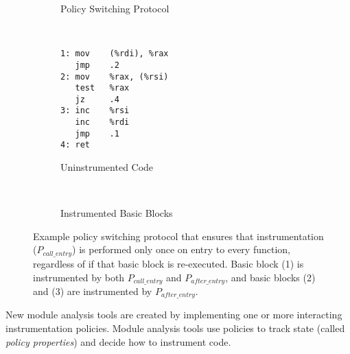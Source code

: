 \documentclass[letterpaper,twocolumn,10pt]{article}
\let\ORIGcaption\caption
\renewcommand{\caption}[2][\compressedcaption]{%
\def\compressedcaption{#2}%
    \vspace{-5pt}%
    \ORIGcaption[#1]{#2}%
    \vspace{-12pt}}
\begin{document}
\lstset{language=[x64]Assembler}
\begin{figure*}[ht!]
\centering
\begin{subfigure}[b]{0.33\textwidth}
\ORIGcaption{Policy Switching Protocol}
\end{subfigure}%
~
\begin{subfigure}[b]{0.33\textwidth}%
\begin{lstlisting}[basicstyle=\footnotesize\ttfamily]
1: mov    (%rdi), %rax
   jmp    .2
2: mov    %rax, (%rsi)
   test   %rax
   jz     .4
3: inc    %rsi
   inc    %rdi
   jmp    .1
4: ret
\end{lstlisting}
\ORIGcaption{Uninstrumented Code}
\end{subfigure}%
~
\begin{subfigure}[b]{0.33\textwidth}%
\hspace{-3em}
\ORIGcaption{Instrumented Basic Blocks}
\end{subfigure}
\caption{\label{fig:policy_switching}Example policy switching protocol that ensures that instrumentation ($P_{call\_entry}$) is performed only once on entry to every function, regardless of if that basic block is re-executed. Basic block (1) is instrumented by both $P_{call\_entry}$ and $P_{after\_entry}$, and basic blocks (2) and (3) are instrumented by $P_{after\_entry}$.}
\end{figure*}


New module analysis tools are created by implementing one or more interacting instrumentation policies. Module analysis tools use policies to track state (called \emph{policy properties}) and decide how to instrument code.
\end{document}
